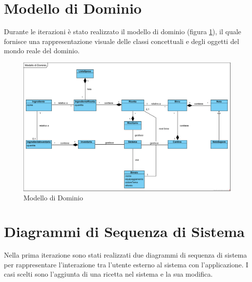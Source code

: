 \documentclass[a4paper,12pt]{report}
\begin{document}
	\newpage	
	\section{Modello di Dominio}
Durante le iterazioni è stato realizzato il modello di dominio (figura \ref{fig:Modello-Dominio}), il quale fornisce una rappresentazione visuale delle classi concettuali e degli oggetti del mondo reale del dominio.
		\begin{figure}[!h]
			\centering
			\includegraphics[width=1\linewidth]{image/Modello-di-Dominio.png}
			\caption{Modello di Dominio}\label{fig:Modello-Dominio}
		\end{figure}

	\newpage
	\section{Diagrammi di Sequenza di Sistema}
	Nella prima iterazione sono stati realizzati due diagrammi di sequenza di sistema per rappresentare l'interazione tra l'utente esterno al sistema con l'applicazione.
	I casi scelti sono l'aggiunta di una ricetta nel sistema e la sua modifica.
\end{document}

